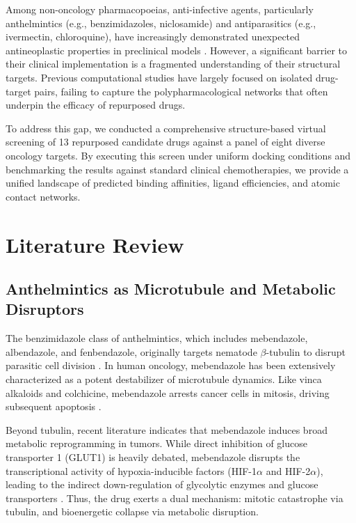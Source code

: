 \documentclass[10pt,a4paper,twocolumn]{article}
\begin{document}
Among non-oncology pharmacopoeias, anti-infective agents, particularly anthelmintics (e.g., benzimidazoles, niclosamide) and antiparasitics (e.g., ivermectin, chloroquine), have increasingly demonstrated unexpected antineoplastic properties in preclinical models \cite{guerini2019, ren2010}. However, a significant barrier to their clinical implementation is a fragmented understanding of their structural targets. Previous computational studies have largely focused on isolated drug-target pairs, failing to capture the polypharmacological networks that often underpin the efficacy of repurposed drugs. 

To address this gap, we conducted a comprehensive structure-based virtual screening of 13 repurposed candidate drugs against a panel of eight diverse oncology targets. By executing this screen under uniform docking conditions and benchmarking the results against standard clinical chemotherapies, we provide a unified landscape of predicted binding affinities, ligand efficiencies, and atomic contact networks.

\section{Literature Review}

\subsection{Anthelmintics as Microtubule and Metabolic Disruptors}
The benzimidazole class of anthelmintics, which includes mebendazole, albendazole, and fenbendazole, originally targets nematode $\beta$-tubulin to disrupt parasitic cell division \cite{bai2011}. In human oncology, mebendazole has been extensively characterized as a potent destabilizer of microtubule dynamics. Like vinca alkaloids and colchicine, mebendazole arrests cancer cells in mitosis, driving subsequent apoptosis \cite{bai2011, guerini2019}. 

Beyond tubulin, recent literature indicates that mebendazole induces broad metabolic reprogramming in tumors. While direct inhibition of glucose transporter 1 (GLUT1) is heavily debated, mebendazole disrupts the transcriptional activity of hypoxia-inducible factors (HIF-1$\alpha$ and HIF-2$\alpha$), leading to the indirect down-regulation of glycolytic enzymes and glucose transporters \cite{guerini2019}. Thus, the drug exerts a dual mechanism: mitotic catastrophe via tubulin, and bioenergetic collapse via metabolic disruption.
\end{document}
